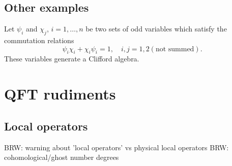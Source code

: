 \documentclass[11pt]{amsart}
\def\brian#1{{\textcolor{blue!65!red}{BRW: {#1}}}}
\begin{document}
\subsection{Other examples}
Let $\psi_i$ and $\chi_j$, $i=1,\ldots, n$ be two sets of odd variables which satisfy the commutation relations
\[
\psi_i \chi_i + \chi_i \psi_i = 1, \quad i,j=1,2 (\text{not summed}).
\]
These variables generate a Clifford algebra. 





%

\section{QFT rudiments}


\subsection{Local operators}

\brian{warning about 'local operators' vs physical local operators}
\brian{cohomological/ghost number degrees}
\end{document}
